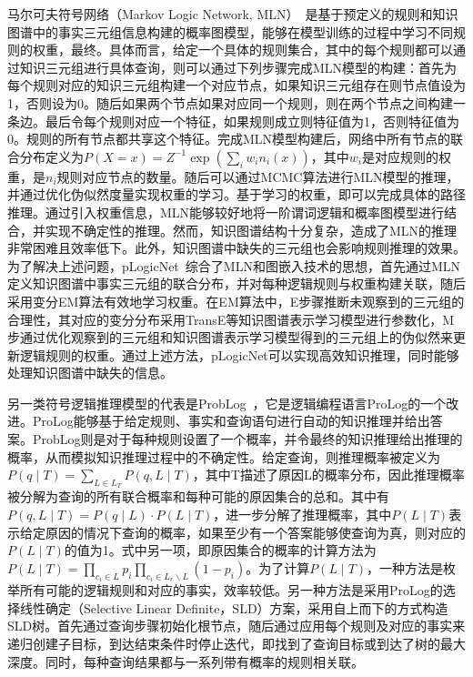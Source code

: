 \documentclass[algorithmlist, AutoFakeBold, AutoFakeSlant, figurelist, tablelist, nomlist, engineering]{seuthesix}
\begin{document}
马尔可夫符号网络（Markov Logic Network, MLN）~\cite{richardson2006markov}是基于预定义的规则和知识图谱中的事实三元组信息构建的概率图模型，能够在模型训练的过程中学习不同规则的权重，最终。具体而言，给定一个具体的规则集合，其中的每个规则都可以通过知识三元组进行具体查询，则可以通过下列步骤完成MLN模型的构建：首先为每个规则对应的知识三元组构建一个对应节点，如果知识三元组存在则节点值设为1，否则设为0。随后如果两个节点如果对应同一个规则，则在两个节点之间构建一条边。最后令每个规则对应一个特征，如果规则成立则特征值为1，否则特征值为0。规则的所有节点都共享这个特征。完成MLN模型构建后，网络中所有节点的联合分布定义为$P(X=x)=Z^{-1} \exp \left(\sum_i w_i n_i(x)\right)$，其中$w_i$是对应规则的权重，是$n_i$规则对应节点的数量。随后可以通过MCMC算法进行MLN模型的推理，并通过优化伪似然度量实现权重的学习。基于学习的权重，即可以完成具体的路径推理。通过引入权重信息，MLN能够较好地将一阶谓词逻辑和概率图模型进行结合，并实现不确定性的推理。然而，知识图谱结构十分复杂，造成了MLN的推理非常困难且效率低下。此外，知识图谱中缺失的三元组也会影响规则推理的效果。为了解决上述问题，pLogicNet~\cite{qu2019probabilistic}综合了MLN和图嵌入技术的思想，首先通过MLN定义知识图谱中事实三元组的联合分布，并对每种逻辑规则与权重构建关联，随后采用变分EM算法有效地学习权重。在EM算法中，E步骤推断未观察到的三元组的合理性，其对应的变分分布采用TransE等知识图谱表示学习模型进行参数化，M步通过优化观察到的三元组和知识图谱表示学习模型得到的三元组上的伪似然来更新逻辑规则的权重。通过上述方法，pLogicNet可以实现高效知识推理，同时能够处理知识图谱中缺失的信息。

另一类符号逻辑推理模型的代表是ProbLog~\cite{de2007problog}，它是逻辑编程语言ProLog的一个改进。ProLog能够基于给定规则、事实和查询语句进行自动的知识推理并给出答案。ProbLog则是对于每种规则设置了一个概率，并令最终的知识推理给出推理的概率，从而模拟知识推理过程中的不确定性。给定查询，则推理概率被定义为$P\left(q \mid T\right)=\sum_{L \in L_T} P(q, L \mid T)$，其中T描述了原因L的概率分布，因此推理概率被分解为查询的所有联合概率和每种可能的原因集合的总和。其中有$P(q, L \mid T)=P(q \mid L) \cdot P(L \mid T)$，进一步分解了推理概率，其中$P(L \mid T)$表示给定原因的情况下查询的概率，如果至少有一个答案能够使查询为真，则对应的$P(L \mid T)$的值为1。式中另一项，即原因集合的概率的计算方法为$P(L \mid T)=\prod_{c_i \in L} p_i \prod_{c_i \in L_r \backslash L}\left(1-p_i\right)$。为了计算$P(L \mid T)$，一种方法是枚举所有可能的逻辑规则和对应的事实，效率较低。另一种方法是采用ProLog的选择线性确定（Selective Linear Definite，SLD）方案，采用自上而下的方式构造SLD树。首先通过查询步骤初始化根节点，随后通过应用每个规则及对应的事实来递归创建子目标，到达结束条件时停止迭代，即找到了查询目标或到达了树的最大深度。同时，每种查询结果都与一系列带有概率的规则相关联。
\end{document}
